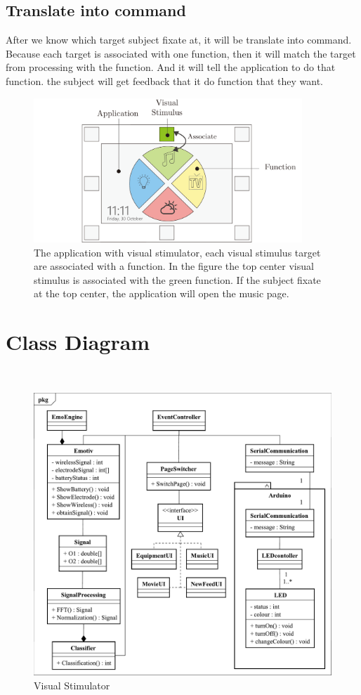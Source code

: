 \subsection{Translate into command}
\hspace{1.5cm} After we know which target subject fixate at, it will be translate into command. Because each target is associated with one function, then it will match the target from processing with the function. And it will tell the application to do that function. the subject will get feedback that it do function that they want.

\begin{figure}[ht]
	\centering
	\includegraphics[width=0.9\textwidth]{chapter5/associate.pdf}
	\caption{The application with visual stimulator, each visual stimulus target are associated with a function. In the figure the top center visual stimulus is associated with the green function. If the subject fixate at the top center, the application will open the music page. }
\end{figure}

\newpage
\section{Class Diagram}
\
\begin{figure}[ht]
	\centering
	\includegraphics[width=\textwidth]{chapter5/Class.pdf}
	\caption{Visual Stimulator}
\end{figure}

